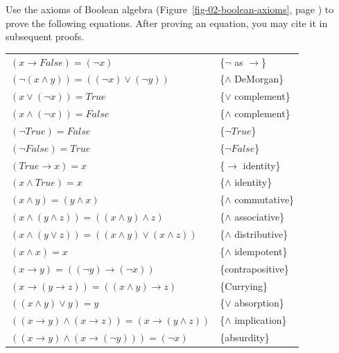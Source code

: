 \begin{ExerciseList}
\Exercise Use the axioms of Boolean algebra (Figure~\ref{fig-02-boolean-axioms}, page \pageref{fig-02-boolean-axioms})
to prove the following equations. After proving an equation, you may cite it in subsequent proofs.
\label{some-boolean-theorems}
\begin{center}
\begin{tabular}{ll}
$(x \rightarrow False) = (\neg x)$                                   & \{$\neg$ as $\rightarrow$\}\label{neg-as-imp} \\
$(\neg(x \wedge y)) = ((\neg x) \vee (\neg y))$                      & \{$\wedge$ DeMorgan\}      \label{and-DeMorgan} \\
$(x \vee (\neg x)) = True$                                           & \{$\vee$ complement\}      \label{or-complement} \\
$(x \wedge (\neg x)) = False$                                        & \{$\wedge$ complement\}    \label{and-complement} \\
$(\neg True) = False$                                                & \{$\neg True$\}            \label{not-True} \\
$(\neg False) = True$                                                & \{$\neg False$\}           \label{not-False} \\
$(True \rightarrow x) = x$                                           & \{$\rightarrow$ identity\} \label{imp-identity} \\
$(x \wedge True) = x$                                                & \{$\wedge$ identity\}      \label{and-identity} \\
$(x \wedge y) = (y \wedge x)$                                        & \{$\wedge$ commutative\}   \label{and-commutative} \\
$(x \wedge (y \wedge z)) = ((x \wedge y) \wedge z)$                  & \{$\wedge$ associative\}   \label{and-associative} \\
$(x \wedge (y \vee z)) = ((x \wedge y) \vee (x \wedge z))$           & \{$\wedge$ distributive\}  \label{and-distributive} \\
$(x \wedge x) = x$                                                   & \{$\wedge$ idempotent\}    \label{and-idempotent} \\
$(x \rightarrow y) = ((\neg y) \rightarrow (\neg x))$                & \{contrapositive\}         \label{contrapositive} \\
$(x \rightarrow (y \rightarrow z)) = ((x \wedge y) \rightarrow z)$  & \{Currying\}                \label{currying} \\
$((x \wedge y) \vee y) = y$                                          & \{$\vee$ absorption\}      \label{or-absorption} \\
$((x \rightarrow y) \wedge (x \rightarrow z)) = (x \rightarrow (y \wedge z))$ & \{$\wedge$ implication\} \label{and-implication} \\
$((x \rightarrow y) \wedge (x \rightarrow (\neg y))) = (\neg x)$     & \{absurdity\}              \label{absurdity} \\
\end{tabular}
\end{center}

\end{ExerciseList}

